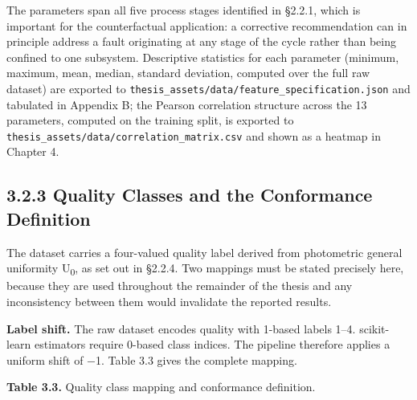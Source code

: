 The parameters span all five process stages identified in §2.2.1, which is important for the counterfactual application: a corrective recommendation can in principle address a fault originating at any stage of the cycle rather than being confined to one subsystem. Descriptive statistics for each parameter (minimum, maximum, mean, median, standard deviation, computed over the full raw dataset) are exported to \texttt{thesis\_assets/data/feature\_specification.json} and tabulated in Appendix B; the Pearson correlation structure across the 13 parameters, computed on the training split, is exported to \texttt{thesis\_assets/data/correlation\_matrix.csv} and shown as a heatmap in Chapter 4.

\hypertarget{quality-classes-and-the-conformance-definition}{%
\subsection{3.2.3 Quality Classes and the Conformance Definition}\label{quality-classes-and-the-conformance-definition}}

The dataset carries a four-valued quality label derived from photometric general uniformity U\textsubscript{0}, as set out in §2.2.4. Two mappings must be stated precisely here, because they are used throughout the remainder of the thesis and any inconsistency between them would invalidate the reported results.

\textbf{Label shift.} The raw dataset encodes quality with 1-based labels 1--4. scikit-learn estimators require 0-based class indices. The pipeline therefore applies a uniform shift of −1. Table 3.3 gives the complete mapping.

\textbf{Table 3.3.} Quality class mapping and conformance definition.

